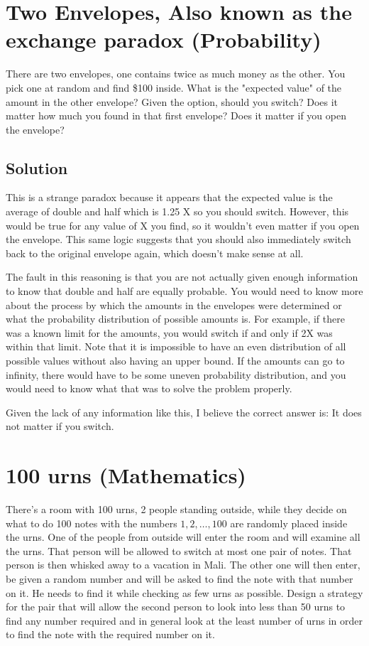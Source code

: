 \documentclass{article}
\begin{document}
\section{Two Envelopes, Also known as the exchange paradox (Probability)}
There are two envelopes, one contains twice as much money as the other. You pick one at random and find \$100 inside. What is the "expected value" of the amount in the other envelope? Given the option, should you switch? Does it matter how much you found in that first envelope? Does it matter if you open the envelope?

\subsection{Solution}
This is a strange paradox because it appears that the expected value is the average of double and half which is 1.25 X so you should switch. However, this would be true for any value of X you find, so it wouldn't even matter if you open the envelope. This same logic suggests that you should also immediately switch back to the original envelope again, which doesn't make sense at all.

The fault in this reasoning is that you are not actually given enough information to know that double and half are equally probable. You would need to know more about the process by which the amounts in the envelopes were determined or what the probability distribution of possible amounts is. For example, if there was a known limit for the amounts, you would switch if and only if 2X was within that limit. Note that it is impossible to have an even distribution of all possible values without also having an upper bound. If the amounts can go to infinity, there would have to be some uneven probability distribution, and you would need to know what that was to solve the problem properly.

Given the lack of any information like this, I believe the correct answer is: It does not matter if you switch.

\section{100 urns (Mathematics)}
There's a room with 100 urns, 2 people standing outside, while they decide on what to do 100 notes with the numbers $1, 2, \ldots,100$ are randomly placed inside the urns. One of the people from outside will enter the room and will examine all the urns. That person will be allowed to switch at most one pair of notes. That person is then whisked away to a vacation in Mali. The other one will then enter, be given a random number and will be asked to find the note with that number on it. He needs to find it while checking as few urns as possible. Design a strategy for the pair that will allow the second person to look into less than 50 urns to find any number required and in general look at the least number of urns in order to find the note with the required number on it.
\end{document}
